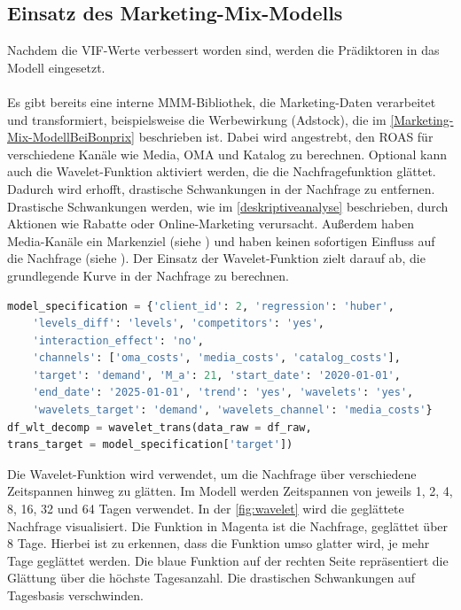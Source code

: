 \subsection{Einsatz des Marketing-Mix-Modells}
\label{EinsatzDesMarketing-Mix-Modells}
Nachdem die \ac{VIF}-Werte verbessert worden sind, werden die Prädiktoren in das Modell eingesetzt. \\\\
Es gibt bereits eine interne \ac{MMM}-Bibliothek, die Marketing-Daten verarbeitet und transformiert, beispielsweise die Werbewirkung (Adstock), die im \autoref{Marketing-Mix-ModellBeiBonprix} beschrieben ist. Dabei wird angestrebt, den \ac{ROAS} für verschiedene Kanäle wie Media, \ac{OMA} und Katalog zu berechnen. Optional kann auch die Wavelet-Funktion aktiviert werden, die die Nachfragefunktion glättet. Dadurch wird erhofft, drastische Schwankungen in der Nachfrage zu entfernen. Drastische Schwankungen werden, wie im \autoref{deskriptiveanalyse} beschrieben, durch Aktionen wie Rabatte oder Online-Marketing verursacht. Außerdem haben Media-Kanäle ein Markenziel (siehe ) und haben keinen sofortigen Einfluss auf die Nachfrage (siehe ). Der Einsatz der Wavelet-Funktion zielt darauf ab, die grundlegende Kurve in der Nachfrage zu berechnen.  
\begin{lstlisting}[language=Python, linewidth=\textwidth]
model_specification = {'client_id': 2, 'regression': 'huber', 
    'levels_diff': 'levels', 'competitors': 'yes', 
    'interaction_effect': 'no', 
    'channels': ['oma_costs', 'media_costs', 'catalog_costs'],
    'target': 'demand', 'M_a': 21, 'start_date': '2020-01-01', 
    'end_date': '2025-01-01', 'trend': 'yes', 'wavelets': 'yes', 
    'wavelets_target': 'demand', 'wavelets_channel': 'media_costs'}
df_wlt_decomp = wavelet_trans(data_raw = df_raw, 
trans_target = model_specification['target'])
\end{lstlisting}
Die Wavelet-Funktion wird verwendet, um die Nachfrage über verschiedene Zeitspannen hinweg zu glätten. Im Modell werden Zeitspannen von jeweils 1, 2, 4, 8, 16, 32 und 64 Tagen verwendet. In der \autoref{fig:wavelet} wird die geglättete Nachfrage visualisiert. Die Funktion in Magenta ist die Nachfrage, geglättet über 8 Tage. Hierbei ist zu erkennen, dass die Funktion umso glatter wird, je mehr Tage geglättet werden. Die blaue Funktion auf der rechten Seite repräsentiert die Glättung über die höchste Tagesanzahl. Die drastischen Schwankungen auf Tagesbasis verschwinden. \\\\
